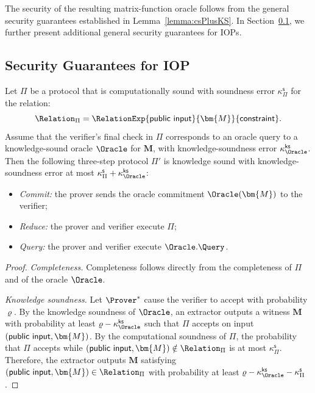 The security of the resulting matrix-function oracle follows from the general security guarantees established in Lemma~\ref{lemma:csPlusKS}.
In Section~\ref{sec:iopsecurity}, we further present additional general security guarantees for IOPs.

\subsection{Security Guarantees for IOP}
\label{sec:iopsecurity}

\begin{lemma}[Computational Sound Protocol + Knowledge Sound Oracle = Knowledge Sound IOP]
\label{lemma:csPlusKS}
Let $\Pi$ be a protocol that is computationally sound with soundness error
$\kappa_\Pi^{\mathsf{s}}$ for the relation:
\[
    \Relation_\Pi =
    \RelationExp{
    \text{\sf public input}
    }{\bm{M}}{\text{\sf constraint}}.
\]
Assume that the verifier’s final check in $\Pi$ corresponds to an oracle query
to a knowledge-sound oracle $\Oracle$ for $\bm{M}$, with knowledge-soundness
error $\kappa_\Oracle^{\mathsf{ks}}$.
Then the following three-step protocol $\Pi'$ is knowledge sound with
knowledge-soundness error at most
$\kappa_\Pi^{\mathsf{s}} + \kappa_\Oracle^{\mathsf{ks}}$:
\begin{itemize}
    \item {\em Commit:} the prover sends the oracle commitment $\Oracle(\bm{M})$ to the verifier;
    \item {\em Reduce:} the prover and verifier execute $\Pi$;
    \item {\em Query:} the prover and verifier execute $\Oracle.\Query$.
\end{itemize}
\end{lemma}

\begin{proof}
\emph{Completeness.}
Completeness follows directly from the completeness of $\Pi$ and of the oracle $\Oracle$.

\smallskip
\noindent
\emph{Knowledge soundness.}
Let $\Prover^\ast$ cause the verifier to accept
with probability $\varrho$.
By the knowledge soundness of $\Oracle$, an extractor outputs a witness $\bm{M}$
with probability at least $\varrho - \kappa_\Oracle^{\mathsf{ks}}$
such that $\Pi$ accepts on input $(\text{\sf public input}, \bm{M})$.
By the computational soundness of $\Pi$, the probability that
$\Pi$ accepts while $(\text{\sf public input}, \bm{M}) \notin \Relation_\Pi$
is at most $\kappa_\Pi^{\mathsf{s}}$.
Therefore, the extractor outputs $\bm{M}$ satisfying
$(\text{\sf public input}, \bm{M}) \in \Relation_\Pi$
with probability at least
$\varrho - \kappa_\Oracle^{\mathsf{ks}} - \kappa_\Pi^{\mathsf{s}}$.
\end{proof}


